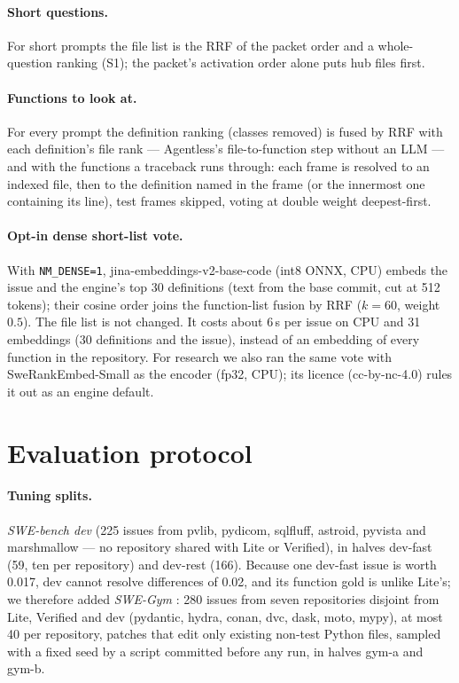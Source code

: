 \documentclass[10pt,twocolumn]{article}
\begin{document}
\paragraph{Short questions.}
For short prompts the file list is the RRF of the packet order and a whole-question ranking (S1);
the packet's activation order alone puts hub files first.

\paragraph{Functions to look at.}
For every prompt the definition ranking (classes removed) is fused by RRF with each definition's file
rank --- Agentless's file-to-function step without an LLM --- and with the functions a traceback runs
through: each frame is resolved to an indexed file, then to the definition named in the frame (or
the innermost one containing its line), test frames skipped, voting at double weight deepest-first.

\paragraph{Opt-in dense short-list vote.}
With \texttt{NM\_DENSE=1}, jina-embeddings-v2-base-code \citep{gunther2023jina} (int8 ONNX, CPU)
embeds the issue and the engine's top 30 definitions (text from the base commit, cut at 512 tokens);
their cosine order joins the function-list fusion by RRF ($k=60$, weight $0.5$). The file list is not
changed. It costs about 6\,s per issue on CPU and 31 embeddings (30 definitions and the issue), instead of an embedding of every
function in the repository. For research we also ran the same vote with SweRankEmbed-Small
\citep{reddy2026swerank} as the encoder (fp32, CPU); its licence (cc-by-nc-4.0) rules it out as an
engine default.

\section{Evaluation protocol}
\label{sec:protocol}

\paragraph{Tuning splits.}
\emph{SWE-bench dev} (225 issues from pvlib, pydicom, sqlfluff, astroid, pyvista and marshmallow ---
no repository shared with Lite or Verified), in halves dev-fast (59, ten per repository) and dev-rest
(166). Because one dev-fast issue is worth 0.017, dev cannot resolve differences of 0.02, and its
function gold is unlike Lite's; we therefore added \emph{SWE-Gym} \citep{pan2025swegym}: 280 issues
from seven repositories disjoint from Lite, Verified and dev (pydantic, hydra, conan, dvc, dask,
moto, mypy), at most 40 per repository, patches that edit only existing non-test Python files,
sampled with a fixed seed by a script committed before any run, in halves gym-a and gym-b.
\end{document}
